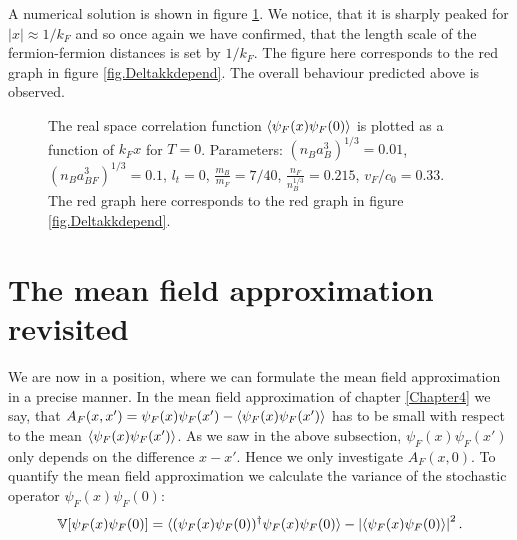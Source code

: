 A numerical solution is shown in figure \ref{fig.pairwavefunction}. We notice, that it is sharply peaked for $|x| \approx 1/k_F$ and so once again we have confirmed, that the length scale of the fermion-fermion distances is set by $1/k_F$. The figure here corresponds to the red graph in figure \ref{fig.Deltakkdepend}. The overall behaviour predicted above is observed. %

\begin{figure} 
\begin{center}  
  
\caption{The real space correlation function $\braket{\psi_F(x)\psi_F(0)}$ is plotted as a function of $k_Fx$ for $T = 0$. Parameters: $(n_Ba_B^3)^{1/3} = 0.01$, $(n_Ba_{BF}^3)^{1/3} = 0.1$, $l_t = 0$, $\frac{m_B}{m_F} = 7/40$, $\frac{n_F}{n_B^{1/3}} = 0.215$, $v_F/c_0 = 0.33$. The red graph here corresponds to the red graph in figure \ref{fig.Deltakkdepend}.}  
\label{fig.pairwavefunction}  
\end{center}    
\end{figure}

\section{The mean field approximation revisited}
We are now in a position, where we can formulate the mean field approximation in a precise manner. In the mean field approximation of chapter \ref{Chapter4} we say, that $A_F(x,x') = \psi_F(x)\psi_F(x') - \braket{\psi_F(x)\psi_F(x')}$ has to be small with respect to the mean $\braket{\psi_F(x)\psi_F(x')}$. As we saw in the above subsection, $\psi_F(x)\psi_F(x')$ only depends on the difference $x-x'$. Hence we only investigate $A_F(x,0)$. 
To quantify the mean field approximation we calculate the variance of the stochastic operator $\psi_F(x)\psi_F(0)$:
\begin{equation}
\mathbb{V}[\psi_F(x)\psi_F(0)] = \braket{(\psi_F(x)\psi_F(0))^\dagger \psi_F(x)\psi_F(0)} - \left|\braket{\psi_F(x)\psi_F(0)}\right|^2. \nonumber  
\end{equation}


